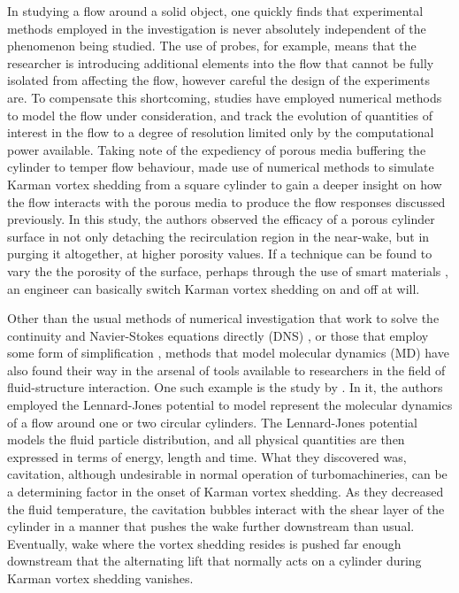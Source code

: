 \documentclass[oneside]{utmthesis}
\begin{document}
In studying a flow around a solid object, one quickly finds that experimental methods employed in the investigation is never absolutely independent of the phenomenon being studied. The use of probes, for example, means that the researcher is introducing additional elements into the flow that cannot be fully isolated from affecting the flow, however careful the design of the experiments are. To compensate this shortcoming, studies have employed numerical methods to model the flow under consideration, and track the evolution of quantities of interest in the flow to a degree of resolution limited only by the computational power available. Taking note of the expediency of porous media buffering the cylinder to temper flow behaviour, \citet{Ledda2018} made use of numerical methods to simulate Karman vortex shedding from a square cylinder to gain a deeper insight on how the flow interacts with the porous media to produce the flow responses discussed previously. In this study, the authors observed the efficacy of a porous cylinder surface in not only detaching the recirculation region in the near-wake, but in purging it altogether, at higher porosity values. If a technique can be found to vary the the porosity of the surface, perhaps through the use of smart materials \citep{Arsh2020}, an engineer can basically switch Karman vortex shedding on and off at will.

Other than the usual methods of numerical investigation that work to solve the continuity and Navier-Stokes equations directly (DNS) \citep{Xiong2018,AlvesPortela2020}, or those that employ some form of simplification \citep{Deloze2016,Shao2016}, methods that model molecular dynamics (MD) have also found their way in the arsenal of tools available to researchers in the field of fluid-structure interaction. One such example is the study by \citet{Asano2020}. In it, the authors employed the Lennard-Jones potential to model represent the molecular dynamics of a flow around one or two circular cylinders. The Lennard-Jones potential models the fluid particle distribution, and all physical quantities are then expressed in terms of energy, length and time. What they discovered was, cavitation, although undesirable in normal operation of turbomachineries, can be a determining factor in the onset of Karman vortex shedding. As they decreased the fluid temperature, the cavitation bubbles interact with the shear layer of the cylinder in a manner that pushes the wake further downstream than usual. Eventually, wake where the vortex shedding resides is pushed far enough downstream that the alternating lift that normally acts on a cylinder during Karman vortex shedding vanishes.
\end{document}
